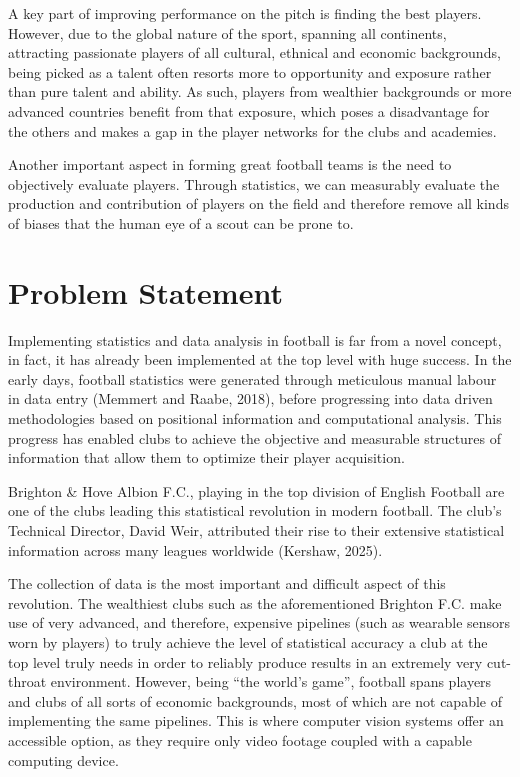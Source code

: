 A key part of improving performance on the pitch is finding the best players. However, due to the global nature of the sport, spanning all continents, attracting passionate players of all cultural, ethnical and economic backgrounds, being picked as a talent often resorts more to opportunity and exposure rather than pure talent and ability. As such, players from wealthier backgrounds or more advanced countries benefit from that exposure, which poses a disadvantage for the others and makes a gap in the player networks for the clubs and academies. 

Another important aspect in forming great football teams is the need to objectively evaluate players. Through statistics, we can measurably evaluate the production and contribution of players on the field and therefore remove all kinds of biases that the human eye of a scout can be prone to.



\section{Problem Statement}

Implementing statistics and data analysis in football is far from a novel concept, in fact, it has already been implemented at the top level with huge success. In the early days, football statistics were generated through meticulous manual labour in data entry (Memmert and Raabe, 2018)\cite{RN01}, before progressing into data driven methodologies based on positional information and computational analysis. This progress has enabled clubs to achieve the objective and measurable structures of information that allow them to optimize their player acquisition.  

Brighton \& Hove Albion F.C., playing in the top division of English Football are one of the clubs leading this statistical revolution in modern football. The club’s Technical Director, David Weir, attributed their rise to their extensive statistical information across many leagues worldwide (Kershaw, 2025)\cite{RN02}. 

The collection of data is the most important and difficult aspect of this revolution. The wealthiest clubs such as the aforementioned Brighton F.C. make use of very advanced, and therefore, expensive pipelines (such as wearable sensors worn by players) to truly achieve the level of statistical accuracy a club at the top level truly needs in order to reliably produce results in an extremely very cut-throat environment.
However, being “the world’s game”, football spans players and clubs of all sorts of economic backgrounds, most of which are not capable of implementing the same pipelines. This is where computer vision systems offer an accessible option, as they require only video footage coupled with a capable computing device. 

